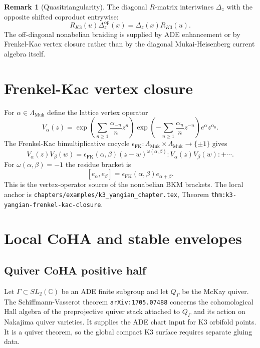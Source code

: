 \documentclass[11pt]{article}
\theoremstyle{definition}
\newtheorem{remark}[theorem]{Remark}
\newcommand{\C}{\mathbb{C}}
\newcommand{\Lmuk}{\Lambda_{\mathrm{Muk}}}
\begin{document}
\begin{remark}[Quasitriangularity]
\label{rem:quasi-triangular}
The diagonal $R$-matrix intertwines $\Delta_z$ with the opposite shifted
coproduct entrywise:
\[
  R_{K3}(u)\Delta_z^{\mathrm{op}}(x)=\Delta_z(x)R_{K3}(u).
\]
The off-diagonal nonabelian braiding is supplied by ADE enhancement or by
Frenkel-Kac vertex closure rather than by the diagonal Mukai-Heisenberg
current algebra itself.
\end{remark}

\section{Frenkel-Kac vertex closure}
\label{sec:fk-closure}

For $\alpha\in\Lmuk$ define the lattice vertex operator
\begin{equation}
\label{eq:vertex-operator-fk}
  V_\alpha(z)
  =
  \exp\!\left(\sum_{n\geq1}\frac{\alpha_{-n}}{n}z^n\right)
  \exp\!\left(-\sum_{n\geq1}\frac{\alpha_n}{n}z^{-n}\right)
  e^\alpha z^{\alpha_0}.
\end{equation}
The Frenkel-Kac bimultiplicative cocycle
$\epsilon_{\mathrm{FK}}:\Lmuk\times\Lmuk\to\{\pm1\}$ gives
\[
  V_\alpha(z)V_\beta(w)
  =
  \epsilon_{\mathrm{FK}}(\alpha,\beta)
  (z-w)^{\omega(\alpha,\beta)}
  :V_\alpha(z)V_\beta(w):
  +\cdots.
\]
For $\omega(\alpha,\beta)=-1$ the residue bracket is
\[
  [e_\alpha,e_\beta]
  =
  \epsilon_{\mathrm{FK}}(\alpha,\beta)e_{\alpha+\beta}.
\]
This is the vertex-operator source of the nonabelian BKM brackets. The
local anchor is
\texttt{chapters/examples/k3\_yangian\_chapter.tex},
Theorem \texttt{thm:k3-yangian-frenkel-kac-closure}.

\section{Local CoHA and stable envelopes}
\label{sec:local-coha-stable}

\subsection{Quiver CoHA positive half}

Let $\Gamma\subset SL_2(\C)$ be an ADE finite subgroup and let
$Q_\Gamma$ be the McKay quiver. The Schiffmann-Vasserot theorem
\texttt{arXiv:1705.07488} concerns the cohomological Hall algebra of the
preprojective quiver stack attached to $Q_\Gamma$ and its action on
Nakajima quiver varieties. It supplies the ADE chart input for K3
orbifold points. It is a quiver theorem, so the global compact K3 surface
requires separate gluing data.
\end{document}
